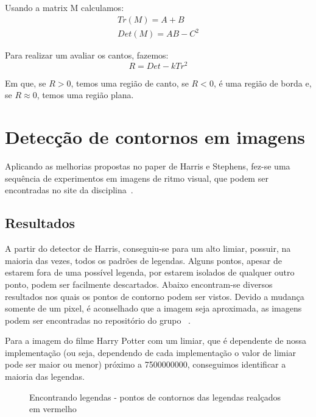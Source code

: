 \documentclass[10pt,a4paper]{article}
\begin{document}
\begin{enumerate}
Usando a matrix M calculamos:
\begin{eqnarray*}
Tr(M) = A + B\\
Det(M) = AB-C^2
\end{eqnarray*}

Para realizar um avaliar os cantos, fazemos:
\begin{equation}
R = Det - kTr^2
\end{equation}

Em que, se $R>0$, temos uma região de canto, se $R<0$, é uma região de
borda e, se $R \approx 0$, temos uma região plana.
\end{enumerate}

\section{Detecção de contornos em imagens}
Aplicando as melhorias propostas no paper de Harris e Stephens,
fez-se uma sequência de experimentos em imagens de ritmo visual, que
podem ser encontradas no site
da disciplina~\cite{imagens}. 

\subsection{Resultados}
A partir do detector de Harris, conseguiu-se para um alto limiar,
possuir, na maioria das vezes, todos os padrões de legendas. Alguns
pontos, apesar de estarem fora de uma possível legenda, por estarem
isolados de qualquer outro ponto, podem ser facilmente descartados. 
Abaixo encontram-se diversos resultados nos quais os pontos de
contorno podem ser vistos. Devido a mudança somente de um pixel, é
aconselhado que a imagem seja aproximada, as imagens podem ser
encontradas no repositório do grupo ~\cite{imgRel}.

Para a imagem do filme Harry Potter com um limiar, que é dependente de
nossa implementação (ou seja, dependendo de cada implementação o valor
de limiar pode ser maior ou menor) próximo a 7500000000, conseguimos
identificar a maioria das legendas.
\begin{figure}[h!]
  \begin{center}
    \hspace{10mm}
    \caption{Encontrando legendas - pontos de contornos das legendas
      realçados em vermelho}
  \end{center}
\end{figure}
\end{document}
